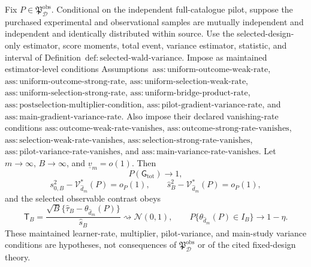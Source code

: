 Fix \(P\in\mathfrak P_{\mathcal D}^{\mathrm{obs}}\). Conditional on the independent full-catalogue pilot, suppose the purchased experimental and observational samples are mutually independent and independent and identically distributed within source. Use the selected-design-only estimator, score moments, total event, variance estimator, statistic, and interval of Definition~\(\mathrm{def{:}selected\text{-}wald\text{-}variance}\). Impose as maintained estimator-level conditions Assumptions~\(\mathrm{ass{:}uniform\text{-}outcome\text{-}weak\text{-}rate}\), \(\mathrm{ass{:}uniform\text{-}outcome\text{-}strong\text{-}rate}\), \(\mathrm{ass{:}uniform\text{-}selection\text{-}weak\text{-}rate}\), \(\mathrm{ass{:}uniform\text{-}selection\text{-}strong\text{-}rate}\), \(\mathrm{ass{:}uniform\text{-}bridge\text{-}product\text{-}rate}\), \(\mathrm{ass{:}postselection\text{-}multiplier\text{-}condition}\), \(\mathrm{ass{:}pilot\text{-}gradient\text{-}variance\text{-}rate}\), and \(\mathrm{ass{:}main\text{-}gradient\text{-}variance\text{-}rate}\). Also impose their declared vanishing-rate conditions \(\mathrm{ass{:}outcome\text{-}weak\text{-}rate\text{-}vanishes}\), \(\mathrm{ass{:}outcome\text{-}strong\text{-}rate\text{-}vanishes}\), \(\mathrm{ass{:}selection\text{-}weak\text{-}rate\text{-}vanishes}\), \(\mathrm{ass{:}selection\text{-}strong\text{-}rate\text{-}vanishes}\), \(\mathrm{ass{:}pilot\text{-}variance\text{-}rate\text{-}vanishes}\), and \(\mathrm{ass{:}main\text{-}variance\text{-}rate\text{-}vanishes}\). Let \(m\to\infty\), \(B\to\infty\), and \(\underline v_m=o(1)\). Then
\[
 P(\mathsf G_{\mathrm{tot}})\longrightarrow1,
\]
\[
 s_{0,B}^2-\mathcal V_{\widehat d_m}^*(P)=o_P(1),
 \qquad
 \widehat s_B^2-\mathcal V_{\widehat d_m}^*(P)=o_P(1),
\]
and the selected observable contrast obeys
\[
 \mathsf T_B=
 \frac{\sqrt B\{\widehat\tau_B-\theta_{\widehat d_m}(P)\}}{\widehat s_B}
 \rightsquigarrow\mathcal N(0,1),
 \qquad
 P\{\theta_{\widehat d_m}(P)\in I_B\}\longrightarrow1-\eta.
\]
These maintained learner-rate, multiplier, pilot-variance, and main-study variance conditions are hypotheses, not consequences of \(\mathfrak P_{\mathcal D}^{\mathrm{obs}}\) or of the cited fixed-design theory.